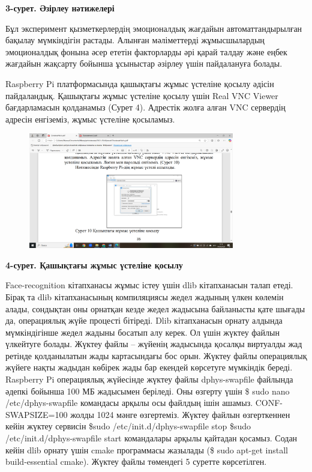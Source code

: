 
{\bfseries 3-сурет. Әзірлеу нәтижелері}

Бұл эксперимент қызметкерлердің эмоционалдық жағдайын автоматтандырылған
бақылау мүмкіндігін растады. Алынған мәліметтерді жұмысшылардың
эмоционалдық фонына әсер ететін факторларды әрі қарай талдау және еңбек
жағдайын жақсарту бойынша ұсыныстар әзірлеу үшін пайдалануға болады.

Raspberry Pi платформасында қашықтағы жұмыс үстеліне қосылу әдісін
пайдаландық. Қашықтағы жұмыс үстеліне қосылу үшін Real VNC Viewer
бағдарламасын қолданамыз (Сурет 4). Адрестік жолға алған VNC сервердің
адресін енгіземіз, жұмыс үстеліне қосыламыз.


\begin{figure}[H]
	\centering
	\includegraphics[width=0.8\textwidth]{media/ict2/image163}
	\caption*{}
\end{figure}


{\bfseries 4-сурет. Қашықтағы жұмыс үстеліне қосылу}

Face-recognition кітапханасы жұмыс істеу үшін dlib кітапханасын талап
етеді. Бірақ та dlib кітапханасының компиляциясы жедел жадының үлкен
көлемін алады, сондықтан оны орнатқан кезде жедел жадысына байланысты
қате шығады да, операциялық жүйе процесті бітіреді. Dlib кітапханасын
орнату алдында мүмкіндігінше жедел жадыны босатып алу керек. Ол үшін
жүктеу файлын үлкейтуге болады. Жүктеу файлы -- жүйенің жадысында
қосалқы виртуалды жад ретінде қолданылатын жады картасындағы бос орын.
Жүктеу файлы операциялық жүйеге нақты жадыдан көбірек жады бар екендей
көрсетуге мүмкіндік береді. Raspberry Pi операциялық жүйесінде жүктеу
файлы dphys-swapfile файлында әдепкі бойынша 100 МБ жадысымен беріледі.
Оны өзгерту үшін \$ sudo nano /etc/dphys-swapfile командасы арқылы осы
файлдың ішін ашамыз. CONF-SWAPSIZE=100 жолды 1024 мәнге өзгертеміз.
Жүктеу файлын өзгерткеннен кейін жүктеу сервисін \$sudo
/etc/init.d/dphys-swapfile stop \$sudo /etc/init.d/dphys-swapfile start
командалары арқылы қайтадан қосамыз. Содан кейін dlib орнату үшін cmake
программасы жазылады (\$ sudo apt-get install build-essential cmake).
Жүктеу файлы төмендегі 5 суретте көрсетілген.


